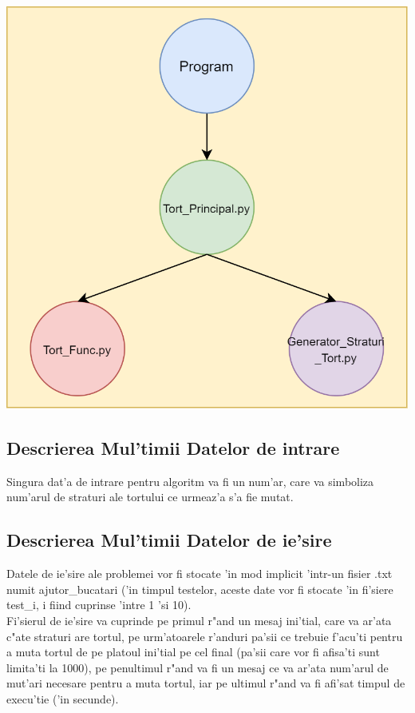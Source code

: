 \documentclass{article}
\begin{document}
\begin{center}
    
\includegraphics[scale=0.25]{StructuraPeNivelInaltPY}\\

\end{center}

\subsection{Descrierea Mul'timii Datelor de intrare}

Singura dat'a de intrare pentru algoritm va fi un num'ar, care va simboliza num'arul de straturi ale tortului ce urmeaz'a s'a fie mutat.

\subsection{Descrierea Mul'timii Datelor de ie'sire}

Datele de ie'sire ale problemei vor fi stocate 'in mod implicit 'intr-un fisier .txt numit ajutor\_bucatari ('in timpul testelor, aceste date vor fi stocate 'in fi'siere test\_i, i fiind cuprinse 'intre 1 'si 10). \\

Fi'sierul de ie'sire va cuprinde pe primul r"and un mesaj ini'tial, care va ar'ata c"ate straturi are tortul, pe urm'atoarele r'anduri pa'sii ce trebuie f'acu'ti pentru a muta tortul de pe platoul ini'tial pe cel final (pa'sii care vor fi afisa'ti sunt limita'ti la 1000), pe penultimul r"and va fi un mesaj ce va ar'ata num'arul de mut'ari necesare pentru a muta tortul, iar pe ultimul r"and va fi afi'sat timpul de execu'tie ('in secunde).
\end{document}

